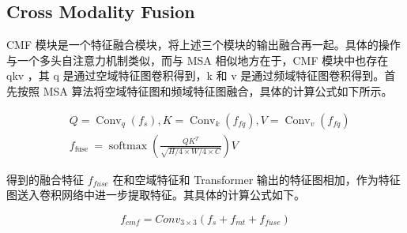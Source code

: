 \subsection{Cross Modality Fusion}

CMF 模块是一个特征融合模块，将上述三个模块的输出融合再一起。具体的操作与一个多头自注意力机制类似，而与 MSA 相似地方在于，CMF 模块中也存在 qkv ，其 q 是通过空域特征图卷积得到，k 和 v 是通过频域特征图卷积得到。首先按照 MSA 算法将空域特征图和频域特征图融合，具体的计算公式如下所示。

$$
\begin{aligned}
&Q=\operatorname{Conv}_{q}\left(f_{s}\right), K=\operatorname{Conv}_{k}\left(f_{f q}\right), V=\operatorname{Conv}_{v}\left(f_{f q}\right) \\
&f_{\text {fuse }}=\operatorname{softmax}\left(\frac{Q K^{T}}{\sqrt{H / 4 \times W / 4 \times C}}\right) V
\end{aligned}
$$

得到的融合特征 $f_{fuse}$ 在和空域特征和 Transformer 输出的特征图相加，作为特征图送入卷积网络中进一步提取特征。其具体的计算公式如下。

$$
f_{c m f}=C o n v_{3 \times 3}\left(f_{s}+f_{m t}+f_{f u s e}\right)
$$

